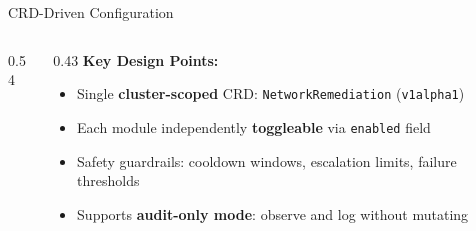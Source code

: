 \documentclass[aspectratio=169, 11pt]{beamer}
\begin{document}
\begin{frame}{CRD-Driven Configuration}

\begin{columns}[T]
\begin{column}{0.54\textwidth}
\centering
{}
\end{column}

\begin{column}{0.43\textwidth}
\footnotesize
\textbf{Key Design Points:}
\begin{itemize}
  \item Single \textbf{cluster-scoped} CRD: \texttt{NetworkRemediation} (\texttt{v1alpha1})
  \item Each module independently \textbf{toggleable} via \texttt{enabled} field
  \item Safety guardrails: cooldown windows, escalation limits, failure thresholds
  \item Supports \textbf{audit-only mode}: observe and log without mutating
\end{itemize}
\end{column}
\end{columns}

\end{frame}
\end{document}
